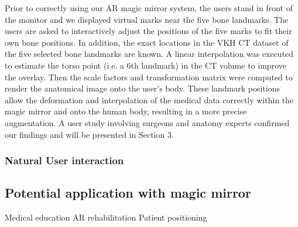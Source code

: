 Prior to correctly using our AR magic mirror system, the users stand in front of the monitor and we displayed virtual marks near the five bone landmarks. The users are asked to interactively adjust the positions of the five marks to fit their own bone positions. In addition, the exact locations in the VKH CT dataset of the five selected bone landmarks are known. A linear interpolation was executed to estimate the torso point (i.e. a 6th landmark) in the CT volume to improve the overlay. Then the scale factors and transformation matrix were computed to render the anatomical image onto the user’s body. These landmark positions allow the deformation and interpolation of the medical data correctly within the magic mirror and onto the human body, resulting in a more precise augmentation. A user study involving surgeons and anatomy experts confirmed our findings and will be presented in Section 3.
\subsubsection{Natural User interaction}

\subsection{Potential application with magic mirror}
Medical education 
AR rehabilitation 
Patient positioning 
